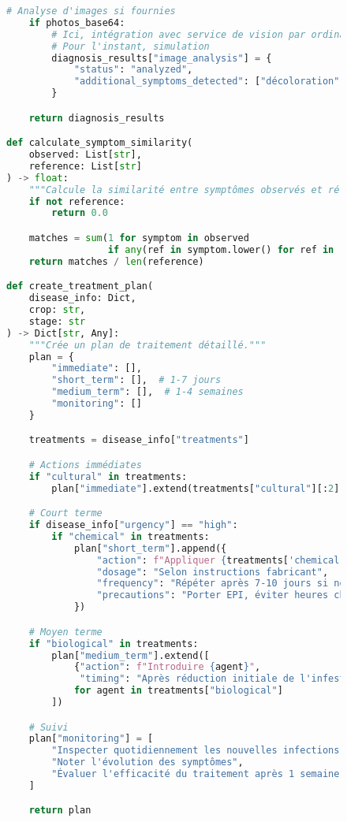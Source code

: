\begin{figure}[h]
\begin{lstlisting}[language=Python, caption=Implémentation d'outils spécialisés pour l'agriculture]
    # Analyse d'images si fournies
    if photos_base64:
        # Ici, intégration avec service de vision par ordinateur
        # Pour l'instant, simulation
        diagnosis_results["image_analysis"] = {
            "status": "analyzed",
            "additional_symptoms_detected": ["décoloration", "nécrose"]
        }

    return diagnosis_results

def calculate_symptom_similarity(
    observed: List[str],
    reference: List[str]
) -> float:
    """Calcule la similarité entre symptômes observés et référence."""
    if not reference:
        return 0.0

    matches = sum(1 for symptom in observed
                  if any(ref in symptom.lower() for ref in reference))
    return matches / len(reference)

def create_treatment_plan(
    disease_info: Dict,
    crop: str,
    stage: str
) -> Dict[str, Any]:
    """Crée un plan de traitement détaillé."""
    plan = {
        "immediate": [],
        "short_term": [],  # 1-7 jours
        "medium_term": [],  # 1-4 semaines
        "monitoring": []
    }

    treatments = disease_info["treatments"]

    # Actions immédiates
    if "cultural" in treatments:
        plan["immediate"].extend(treatments["cultural"][:2])

    # Court terme
    if disease_info["urgency"] == "high":
        if "chemical" in treatments:
            plan["short_term"].append({
                "action": f"Appliquer {treatments['chemical'][0]}",
                "dosage": "Selon instructions fabricant",
                "frequency": "Répéter après 7-10 jours si nécessaire",
                "precautions": "Porter EPI, éviter heures chaudes"
            })

    # Moyen terme
    if "biological" in treatments:
        plan["medium_term"].extend([
            {"action": f"Introduire {agent}",
             "timing": "Après réduction initiale de l'infestation"}
            for agent in treatments["biological"]
        ])

    # Suivi
    plan["monitoring"] = [
        "Inspecter quotidiennement les nouvelles infections",
        "Noter l'évolution des symptômes",
        "Évaluer l'efficacité du traitement après 1 semaine"
    ]

    return plan
\end{lstlisting}
\end{figure}

